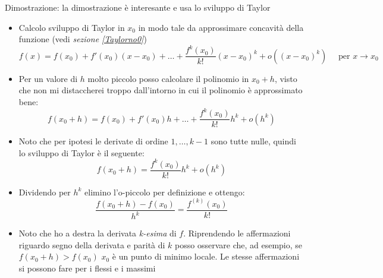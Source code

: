 Dimostrazione: la dimostrazione è interesante e usa lo sviluppo di Taylor
\begin{itemize}
	\item Calcolo sviluppo di Taylor in $  x_0 $ in modo tale da approssimare concavità della funzione (vedi \textit{sezione \ref{Taylorno0}})
	\[
	f\left( x \right) = f\left( x_0 \right)  + f'\left( x_0 \right) \left( x-x_0 \right) +\ldots+ \frac{f^{k}\left( x_0 \right)}{k!}\left( x-x_0 \right) ^{k} + o\left( \left( x-x_0 \right) ^{k} \right)  \quad \text{ per } x \to x_0
	\] 
	\item Per un valore di $ h $ molto piccolo posso calcolare il polinomio in $ x_0+h $, visto che non mi distaccherei troppo dall'intorno in cui il polinomio è approssimato bene:
	\[
	f\left( x_0+h \right) = f\left( x_0 \right) + f'\left( x_0 \right) h + \ldots + \frac{f^{k}\left( x_0 \right)}{k!}h^{k} + o \left( h^{k} \right)  
	\] 
	\item Noto che per ipotesi le derivate di ordine $ 1,\ldots,k-1 $ sono tutte nulle, quindi lo sviluppo di Taylor è il seguente:
	\[
	f\left( x_0+h \right) = \frac{f^{k}\left( x_0 \right)}{k!}h^{k}+ o\left( h^{k} \right)  
	\] 
	\item Dividendo per $ h^{k} $ elimino l'o-piccolo per definizione e ottengo:
	\[
	\frac{f\left( x_0+h \right)- f\left( x_0 \right) }{h^{k}}= \frac{f^{\left( k \right) }\left( x_0 \right) }{k!}
	\] 
	\item Noto che ho a destra la derivata \textit{k-esima} di $ f $. Riprendendo le affermazioni riguardo segno della derivata e parità di $ k $ posso osservare che, ad esempio, se $ f\left( x_0 +h\right)  > f\left( x_0 \right) $ $ x_0 $ è un punto di minimo locale. Le stesse affermazioni si possono fare per i flessi e i massimi
	\end{itemize}

